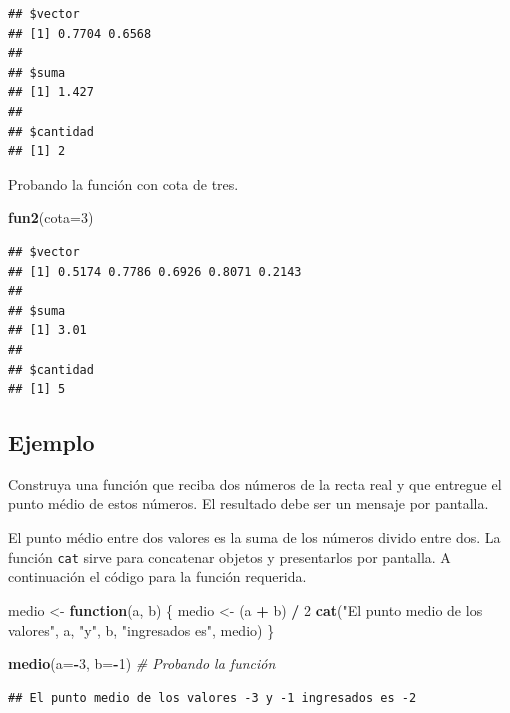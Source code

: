 \documentclass[10pt,]{krantz}
\makeatletter
\newenvironment{Shaded}{\begin{snugshade}}{\end{snugshade}}
\newcommand{\KeywordTok}[1]{\textcolor[rgb]{0.13,0.29,0.53}{\textbf{#1}}}
\newcommand{\DataTypeTok}[1]{\textcolor[rgb]{0.13,0.29,0.53}{#1}}
\newcommand{\DecValTok}[1]{\textcolor[rgb]{0.00,0.00,0.81}{#1}}
\newcommand{\StringTok}[1]{\textcolor[rgb]{0.31,0.60,0.02}{#1}}
\newcommand{\CommentTok}[1]{\textcolor[rgb]{0.56,0.35,0.01}{\textit{#1}}}
\newcommand{\ControlFlowTok}[1]{\textcolor[rgb]{0.13,0.29,0.53}{\textbf{#1}}}
\newcommand{\OperatorTok}[1]{\textcolor[rgb]{0.81,0.36,0.00}{\textbf{#1}}}
\newcommand{\NormalTok}[1]{#1}
\newenvironment{kframe}{%
\medskip{}
\setlength{\fboxsep}{.8em}
 \def\at@end@of@kframe{}%
 \ifinner\ifhmode%
  \def\at@end@of@kframe{\end{minipage}}%
  \begin{minipage}{\columnwidth}%
 \fi\fi%
 \def\FrameCommand##1{\hskip\@totalleftmargin \hskip-\fboxsep
 \colorbox{shadecolor}{##1}\hskip-\fboxsep
     \hskip-\linewidth \hskip-\@totalleftmargin \hskip\columnwidth}%
 \MakeFramed {\advance\hsize-\width
   \@totalleftmargin\z@ \linewidth\hsize
   \@setminipage}}%
 {\par\unskip\endMakeFramed%
 \at@end@of@kframe}
\renewenvironment{Shaded}{\begin{kframe}}{\end{kframe}}
\makeatother
\begin{document}
\begin{verbatim}
## $vector
## [1] 0.7704 0.6568
## 
## $suma
## [1] 1.427
## 
## $cantidad
## [1] 2
\end{verbatim}

Probando la función con cota de tres.

\begin{Shaded}
\begin{Highlighting}[]
\KeywordTok{fun2}\NormalTok{(}\DataTypeTok{cota=}\DecValTok{3}\NormalTok{)}
\end{Highlighting}
\end{Shaded}

\begin{verbatim}
## $vector
## [1] 0.5174 0.7786 0.6926 0.8071 0.2143
## 
## $suma
## [1] 3.01
## 
## $cantidad
## [1] 5
\end{verbatim}

\subsection*{Ejemplo}\label{ejemplo-23}


Construya una función que reciba dos números de la recta real y que
entregue el punto médio de estos números. El resultado debe ser un
mensaje por pantalla.

El punto médio entre dos valores es la suma de los números divido entre
dos. La función \texttt{cat} sirve para concatenar objetos y
presentarlos por pantalla. A continuación el código para la función
requerida.

\begin{Shaded}
\begin{Highlighting}[]
\NormalTok{medio <-}\StringTok{ }\ControlFlowTok{function}\NormalTok{(a, b) \{}
\NormalTok{  medio <-}\StringTok{ }\NormalTok{(a }\OperatorTok{+}\StringTok{ }\NormalTok{b) }\OperatorTok{/}\StringTok{ }\DecValTok{2}
  \KeywordTok{cat}\NormalTok{(}\StringTok{"El punto medio de los valores"}\NormalTok{,}
\NormalTok{      a, }\StringTok{"y"}\NormalTok{, b,}
      \StringTok{"ingresados es"}\NormalTok{, medio)}
\NormalTok{\}}

\KeywordTok{medio}\NormalTok{(}\DataTypeTok{a=}\OperatorTok{-}\DecValTok{3}\NormalTok{, }\DataTypeTok{b=}\OperatorTok{-}\DecValTok{1}\NormalTok{)  }\CommentTok{# Probando la función}
\end{Highlighting}
\end{Shaded}

\begin{verbatim}
## El punto medio de los valores -3 y -1 ingresados es -2
\end{verbatim}
\end{document}
